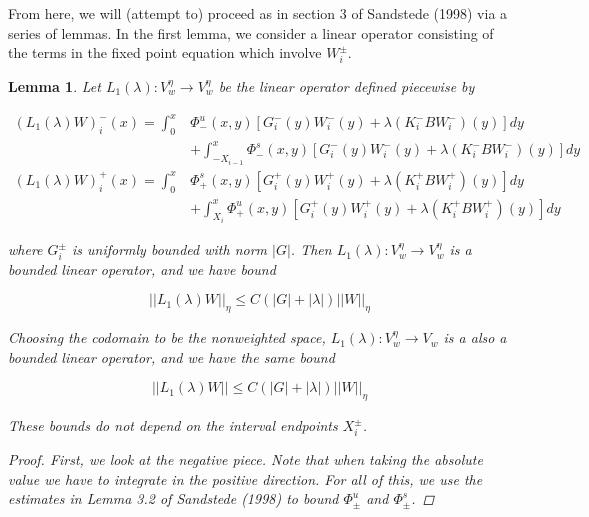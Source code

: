 \documentclass[12pt]{article}
\newtheorem{lemma}{Lemma}
\begin{document}
From here, we will (attempt to) proceed as in section 3 of Sandstede (1998) via a series of lemmas. In the first lemma, we consider a linear operator consisting of the terms in the fixed point equation which involve $W_i^\pm$. 

\begin{lemma}

Let $L_1(\lambda): V_w^\eta \rightarrow V_w^\eta$ be the linear operator defined piecewise by

\begin{align*}
(L_1(\lambda)W)_i^-(x) = \int_0^x &\Phi^u_-(x, y)[G_i^-(y) W_i^-(y) + \lambda (K_i^- B W_i^-)(y) ] dy \\
&+ \int_{-X_{i-1}}^x \Phi^s_-(x, y)[G_i^-(y) W_i^-(y) + \lambda (K_i^-B W_i^-)(y) ] dy \\
(L_1(\lambda)W)_i^+(x) = \int_0^x &\Phi^s_+(x, y)[G_i^+(y) W_i^+(y) + \lambda (K_i^+ B W_i^+)(y)] dy \\
&+ \int_{X_{i}}^x \Phi^u_+(x, y)[G_i^+(y) W_i^+(y) + \lambda (K_i^+ B W_i^+)(y) ] dy
\end{align*}

where $G_i^\pm$ is uniformly bounded with norm $|G|$. Then $L_1(\lambda): V_w^\eta \rightarrow V_w^\eta$ is a bounded linear operator, and we have bound

\begin{equation}
||L_1(\lambda)W||_\eta \leq C\left(|G| +|\lambda|\right)||W||_\eta
\end{equation}

Choosing the codomain to be the nonweighted space, $L_1(\lambda): V_w^\eta \rightarrow V_w$ is a also a bounded linear operator, and we have the same bound

\begin{equation}
||L_1(\lambda)W|| \leq C\left(|G| +|\lambda|\right)||W||_\eta
\end{equation}

These bounds do not depend on the interval endpoints $X_i^\pm$.\\

\begin{proof}
First, we look at the negative piece. Note that when taking the absolute value we have to integrate in the positive direction. For all of this, we use the estimates in Lemma 3.2 of Sandstede (1998) to bound $\Phi^u_\pm$ and $\Phi^s_\pm$.


\end{proof}
\end{lemma}
\end{document}
